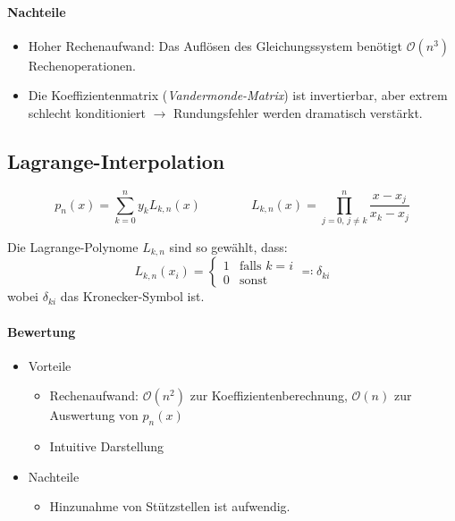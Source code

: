 		\paragraph{Nachteile}
			\begin{itemize}
				\item Hoher Rechenaufwand: Das Auflösen des Gleichungssystem benötigt \( \mathcal{O}(n^3) \) Rechenoperationen.
				\item Die Koeffizientenmatrix (\textit{Vandermonde-Matrix}) ist invertierbar, aber extrem schlecht konditioniert \(\rightarrow\) Rundungsfehler werden dramatisch verstärkt.
			\end{itemize}

	\subsection{Lagrange-Interpolation}
		\begin{equation*}
			p_n(x) = \sum_{k = 0}^n y_k L_{k,n}(x) \qquad\qquad L_{k,n}(x) = \prod_{j = 0,\, j \neq k}^n \frac{x - x_j}{x_k - x_j}
		\end{equation*}

		Die Lagrange-Polynome \( L_{k,n} \) sind so gewählt, dass:
		\begin{equation*}
			L_{k,n}(x_i) =
			\begin{cases}
				1 & \text{falls } k = i \\
				0 & \text{sonst}
			\end{cases}
			\eqqcolon \delta_{ki}
		\end{equation*}
		wobei \( \delta_{ki} \) das Kronecker-Symbol ist.

		\paragraph{Bewertung}
			\begin{itemize}
				\item Vorteile
					\begin{itemize}
						\item Rechenaufwand: \( \mathcal{O}(n^2) \) zur Koeffizientenberechnung, \( \mathcal{O}(n) \) zur Auswertung von \( p_n(x) \)
						\item Intuitive Darstellung
					\end{itemize}
				\item Nachteile
					\begin{itemize}
						\item Hinzunahme von Stützstellen ist aufwendig.
					\end{itemize}
			\end{itemize}

